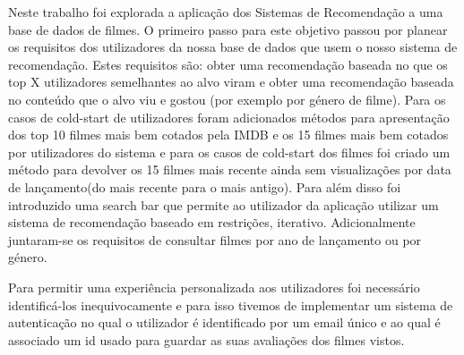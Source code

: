 Neste trabalho foi explorada a aplicação dos Sistemas de Recomendação a uma base de dados de filmes. O primeiro passo para este objetivo passou por planear os requisitos dos utilizadores da nossa base de dados que usem o nosso sistema de recomendação. Estes requisitos são: obter uma recomendação baseada no que os top X utilizadores semelhantes ao alvo viram e obter uma recomendação baseada no conteúdo que o alvo viu e gostou (por exemplo por género de filme). Para os casos de cold-start de utilizadores foram adicionados métodos para apresentação dos top 10 filmes mais bem cotados pela IMDB e os 15 filmes mais bem cotados por utilizadores do sistema e para os casos de cold-start dos filmes foi criado um método para devolver os 15 filmes mais recente ainda sem visualizações por data de lançamento(do mais recente para o mais antigo). Para além disso foi introduzido uma search bar que permite ao utilizador da aplicação utilizar um sistema de recomendação baseado em restrições, iterativo. Adicionalmente juntaram-se os requisitos de consultar filmes por ano de lançamento ou por género.
\par Para permitir uma experiência personalizada aos utilizadores foi necessário identificá-los inequivocamente e para isso tivemos de implementar um sistema de autenticação no qual o utilizador é identificado por um email único e ao qual é associado um id usado para guardar as suas avaliações dos filmes vistos.

\newpage


